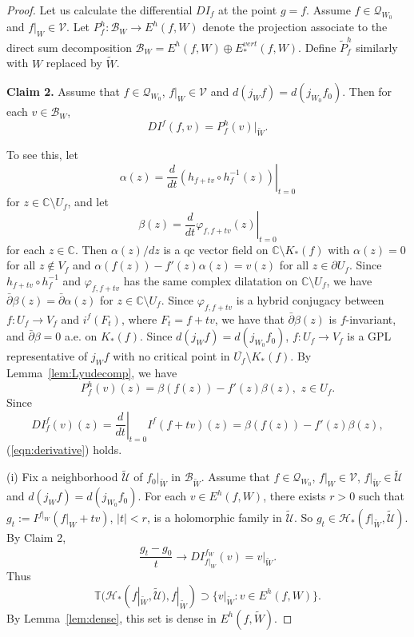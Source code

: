\documentclass{amsart}
\numberwithin{equation}{section}
\newcommand{\C}{\mathbb C}
\theoremstyle{definition}
\theoremstyle{remark}
\begin{document}
\begin{proof}
Let us calculate the differential $D I_f$ at the point $g=f$. Assume $f\in \mathcal{Q}_{W_0}$ and $f|_W\in \mathcal{V}$. Let $P^h_f:\mathcal{B}_{W}\to E^h(f,W)$ denote the projection associate to the direct sum decomposition $\mathcal{B}_{W}=E^h(f,W)\oplus E^{vert}_*(f,W)$. Define $\widetilde{P}^h_f$ similarly with $W$ replaced by $\widetilde{W}$.

{\bf Claim 2.} Assume that $f\in\mathcal{Q}_{W_0}$, $f|_W\in \mathcal{V}$ and $d(j_Wf)=d(j_{W_0}f_0)$. Then for each $v\in \mathcal{B}_W$, 
\begin{equation}\label{eqn:derivative}
DI^f(f,v)=P^h_f(v)|_{\widetilde{W}}.
\end{equation}

To see this, let $$\alpha(z)=\left.\frac{d}{dt} (h_{f+tv}\circ h_f^{-1}(z))\right|_{t=0}$$
for $z\in \mathbb{C}\setminus U_f$, and let 
$$\beta(z)=\left.\frac{d}{dt}\varphi_{f,f+tv}(z)\right|_{t=0}$$
for each $z\in\C$. 
Then $\alpha(z)/dz$ is a qc vector field on $\mathbb{C}\setminus K_*(f)$ with $\alpha(z)=0$ for all $z\not\in V_f$ and $\alpha(f(z))-f'(z)\alpha(z)=v(z)$ for all $z\in \partial U_f$. 
Since $h_{f+tv}\circ h_f^{-1}$ and $\varphi_{f, f+tv}$ has the same complex dilatation on $\mathbb{C}\setminus U_f$, we have $\bar{\partial} \beta(z)=\bar{\partial} \alpha(z)$ for $z\in \mathbb{C}\setminus U_f$. Since $\varphi_{f, f+tv}$ is a hybrid conjugacy between $f:U_f\to V_f$ and $i^f(F_t)$, where $F_t=f+tv$, we have that $\bar{\partial }\beta(z)$ is $f$-invariant, 
and $\bar{\partial} \beta=0$ a.e. on $K_*(f)$. Since $d(j_{W}f)=d(j_{W_0}f_0)$, $f:U_f\to V_f$ is a GPL representative of $j_{W}f$ with no critical point in $\overline{U_f}\setminus K_*(f)$. By Lemma~\ref{lem:Lyudecomp},
we have $$P^h_f(v)(z)=\beta(f(z))-f'(z)\beta(z), \,\, z\in U_f.$$
Since $$DI^f_{f}(v)(z)=\left.\frac{d}{dt}\right|_{t=0} I^f(f+tv)(z)=\beta(f(z))-f'(z) \beta(z),$$
(\ref{eqn:derivative}) holds. 

(i) Fix a neighborhood $\widetilde{\mathcal{U}}$ of $f_0|_{\widetilde{W}}$ in $\mathcal{B}_{\widetilde{W}}$. Assume that $f\in \mathcal{Q}_{W_0}$, $f|_W\in \mathcal{V}$, $f|_{\widetilde{W}}\in \widetilde{\mathcal{U}}$ and $d(j_{W}f)=d(j_{W_0}f_0)$. For each $v\in E^h(f, W)$, there exists $r>0$ such that $g_t :=I^{f|_W}(f|_W+tv)$, $|t|<r$, is a holomorphic family in $\widetilde{\mathcal{U}}$.
So $g_t\in \mathcal{H}_*(f|_{\widetilde{W}}, \widetilde{\mathcal{U}})$. By Claim 2, 
$$\frac{g_t-g_0}{t}\to DI^{f_W}_{f|_W}(v)= v|_{\widetilde{W}}.$$ 
Thus $$\mathbb{T}(\mathcal{H}_*(f|_{\widetilde{W}},\widetilde{\mathcal{U}}), f|_{\widetilde{W}})\supset \{v|_{\widetilde{W}}: v\in E^h(f,W)\}.$$
By Lemma~\ref{lem:dense}, this set is dense in $E^h(f,\widetilde{W})$.


\end{proof}
\end{document}
